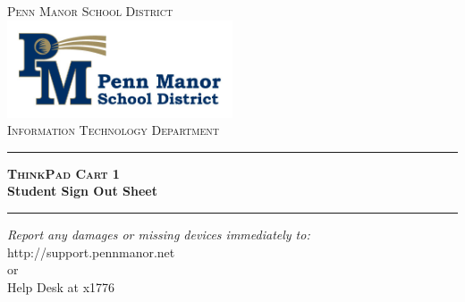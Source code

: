 \begin{titlepage}

\begin{center}

\textsc{\LARGE Penn Manor School District}\\[1.5cm]


\includegraphics[width=0.5\textwidth]{images/logo}\\[1cm]


\textsc{\Large Information Technology Department}\\[0.5cm]


\hrule
{\huge \bfseries \textsc{ThinkPad Cart} 1\\ \vspace{0.5cm} Student Sign Out Sheet}\\[0.4cm]

\hrule


\vfill
\begin{center} \large
\emph{Report any damages or missing devices immediately to:}\\
http://support.pennmanor.net \\or\\Help Desk at x1776
\end{center}


\vfill

\end{center}

\end{titlepage}
